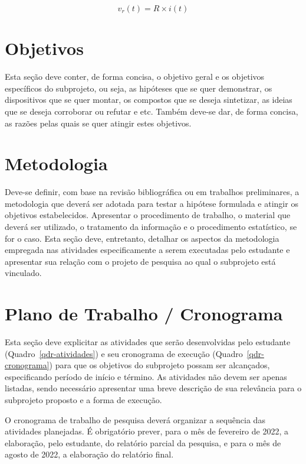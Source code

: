 \documentclass[10pt, a4paper]{article}
\begin{document}
\begin{equation}
	\label{eqn-exemplo}
	v_{r}(t) = R \times i(t)
\end{equation}



\section{Objetivos}

Esta seção deve conter, de forma concisa, o objetivo geral e os objetivos específicos do subprojeto, ou seja, as hipóteses que se quer demonstrar, os dispositivos que se quer montar, os compostos que se deseja sintetizar, as ideias que se deseja corroborar ou refutar e etc. Também deve-se dar, de forma concisa, as razões pelas quais se quer atingir estes objetivos.

 

\section{Metodologia}

Deve-se definir, com base na revisão bibliográfica ou em trabalhos preliminares, a metodologia que deverá ser adotada para testar a hipótese formulada e atingir os objetivos estabelecidos. Apresentar o procedimento de trabalho, o material que deverá ser utilizado, o tratamento da informação e o procedimento estatístico, se for o caso. Esta seção deve, entretanto, detalhar os aspectos da metodologia empregada nas atividades especificamente a serem executadas pelo estudante e apresentar sua relação com o projeto de pesquisa ao qual o subprojeto está vinculado.



\section{Plano de Trabalho / Cronograma}

Esta seção deve explicitar as atividades que serão desenvolvidas pelo estudante (Quadro~\ref{qdr-atividades}) e seu cronograma de execução (Quadro~\ref{qdr-cronograma}) para que os objetivos do subprojeto possam ser alcançados, especificando período de início e término. As atividades não devem ser apenas listadas, sendo necessário apresentar uma breve descrição de sua relevância para o subprojeto proposto e a forma de execução.

O cronograma de trabalho de pesquisa deverá organizar a sequência das atividades planejadas. É obrigatório prever, para o mês de fevereiro de 2022, a elaboração, pelo estudante, do relatório parcial da pesquisa, e para o mês de agosto de 2022, a elaboração do relatório final.
\end{document}
